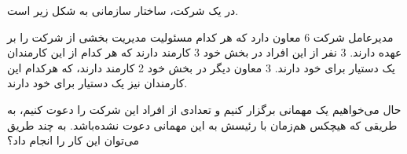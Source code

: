     در یک شرکت، ساختار سازمانی به شکل زیر است.
    
    مدیرعامل شرکت 6 معاون دارد که هر کدام مسئولیت مدیریت بخشی از شرکت را بر عهده دارند.
    3 نفر از این افراد در بخش خود 3 کارمند دارند که هر کدام از این کارمندان یک دستیار برای خود دارند. 3 معاون دیگر در بخش خود 2 کارمند دارند، 
    که هرکدام این کارمندان نیز یک دستیار برای خود دارند.
    
    حال می‌خواهیم یک مهمانی برگزار کنیم و تعدادی از افراد این شرکت را دعوت کنیم، 
    به طریقی که هیچکس هم‌زمان با رئیسش به این مهمانی دعوت نشده‌باشد. 
    به چند طریق می‌توان این کار را انجام داد؟
